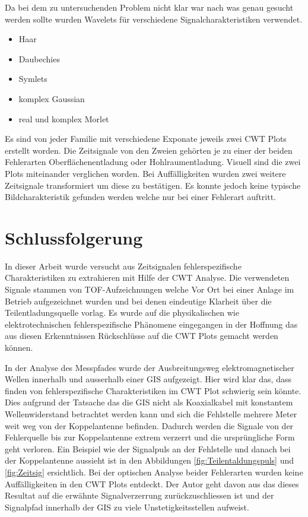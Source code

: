 \begin{refsection}
Da bei dem zu untersuchenden Problem nicht klar war nach was genau gesucht werden sollte wurden Wavelets für verschiedene Signalcharakteristiken verwendet.
\begin{itemize}
	\item Haar
	\item Daubechies 
	\item Symlets
	\item komplex Gaussian
	\item real und komplex Morlet
\end{itemize}
Es sind von jeder Familie mit verschiedene Exponate jeweils zwei CWT Plots erstellt worden. 
Die Zeitsignale von den Zweien gehörten je zu einer der beiden Fehlerarten Oberflächenentladung oder Hohlraumentladung.
Visuell sind die zwei Plots miteinander verglichen worden.
Bei Auffälligkeiten wurden zwei weitere Zeitsignale transformiert um diese zu bestätigen.
Es konnte jedoch keine typische Bildcharakteristik gefunden werden welche nur bei einer Fehlerart auftritt.

\section{Schlussfolgerung}
In dieser Arbeit wurde versucht aus Zeitsignalen fehlerspezifische Charakteristiken zu extrahieren mit Hilfe der CWT Analyse.
Die verwendeten Signale stammen von TOF-Aufzeichnungen welche Vor Ort bei einer Anlage im Betrieb aufgezeichnet wurden und bei denen eindeutige Klarheit über die Teilentladungsquelle vorlag. 
Es wurde auf die physikalischen wie elektrotechnischen fehlerspezifische Phänomene eingegangen in der Hoffnung das aus diesen Erkenntnissen Rückschlüsse auf die CWT Plots gemacht werden können.

In der Analyse des Messpfades wurde der Ausbreitungsweg elektromagnetischer Wellen innerhalb und ausserhalb einer GIS aufgezeigt.
Hier wird klar das, dass finden von fehlerspezifische Charakteristiken im CWT Plot schwierig sein könnte.
Dies aufgrund der Tatsache das die GIS nicht als Koaxialkabel mit konstantem Wellenwiderstand betrachtet werden kann und sich die Fehlstelle mehrere Meter weit weg von der Koppelantenne befinden.
Dadurch werden die Signale von der Fehlerquelle bis zur Koppelantenne extrem verzerrt und die ursprüngliche Form geht verloren.
Ein Beispiel wie der Signalpuls an der Fehlstelle und danach bei der Koppelantenne aussieht ist in den Abbildungen \ref{fig:Teilentaldungspuls} und \ref{fig:Zeitsig} ersichtlich.
Bei der optischen Analyse beider Fehlerarten wurden keine Auffälligkeiten in den CWT Plots entdeckt. 
Der Autor geht davon aus das dieses Resultat auf die erwähnte Signalverzerrung zurückzuschliessen ist und der Signalpfad innerhalb der GIS zu viele Unstetigkeitsstellen aufweist.


\end{refsection}
